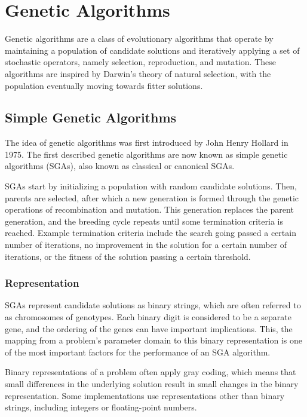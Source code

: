 \documentclass[12pt,titlepage]{article}
\begin{document}
  \newpage

  \section{Genetic Algorithms}
    Genetic algorithms are a class of evolutionary algorithms that operate by maintaining a population of candidate solutions and iteratively applying a set of stochastic operators,
    namely selection, reproduction, and mutation. These algorithms are inspired by Darwin's theory of natural selection, with the population eventually moving towards fitter solutions.

    \subsection{Simple Genetic Algorithms}
      The idea of genetic algorithms was first introduced by John Henry Hollard in 1975. The first described genetic algorithms are now known as simple genetic
      algorithms (SGAs), also known as classical or canonical SGAs.

      SGAs start by initializing a population with random candidate solutions. Then, parents are selected, after which a new generation is formed through the genetic operations of
      recombination and mutation. This generation replaces the parent generation, and the breeding cycle repeats until some termination criteria is reached. Example termination
      criteria include the search going passed a certain number of iterations, no improvement in the solution for a certain number of iterations, or the fitness of the solution
      passing a certain threshold.

      \subsubsection{Representation}
        SGAs represent candidate solutions as binary strings, which are often referred to as chromosomes of genotypes. Each binary digit is considered to be a separate gene, and
        the ordering of the genes can have important implications. This, the mapping from a problem's parameter domain to this binary representation is one of the most important
        factors for the performance of an SGA algorithm.

        Binary representations of a problem often apply gray coding, which means that small differences in the underlying solution result in small changes in the binary
        representation. Some implementations use representations other than binary strings, including integers or floating-point numbers.
\end{document}
